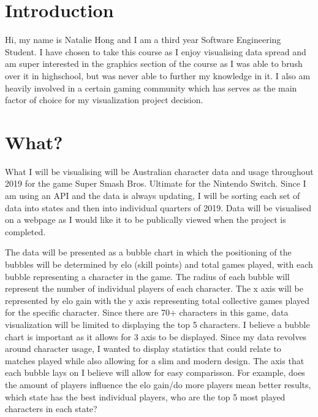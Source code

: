 \documentclass[11pt, oneside, a4paper]{article}
\begin{document}
\section*{Introduction}
Hi, my name is Natalie Hong and I am a third year Software Engineering Student. I have chosen to take this course as I enjoy visualising data spread and am super interested in the graphics section of the course as I was able to brush over it in highschool, but was never able to further my knowledge in it.
I also am heavily involved in a certain gaming community which has serves as the main factor of choice for my visualization project decision.

\section*{What?}
What I will be visualising will be Australian character data and usage throughout 2019 for the game Super Smash Bros. Ultimate for the Nintendo Switch. 
Since I am using an API and the data is always updating, I will be sorting each set of data into states and then into individual quarters of 2019.
Data will be visualised on a webpage as I would like it to be publically viewed when the project is completed.

The data will be presented as a bubble chart in which the positioning of the bubbles will be determined by elo (skill points) and total games played, with each bubble representing a character in the game. The radius of each bubble will represent the number of individual players of each character. The x axis will be represented by elo gain with the y axis representing total collective games played for the specific character.
Since there are 70+ characters in this game, data visualization will be limited to displaying the top 5 characters.
I believe a bubble chart is important as it allows for 3 axis to be displayed. Since my data revolves around character usage, I wanted to display statistics that could relate to matches played while also allowing for a slim and modern design. The axis that each bubble lays on I believe will allow for easy comparisson. For example, does the amount of players influence the elo gain/do more players mean better results, which state has the best individual players, who are the top 5 most played characters in each state?
\end{document}
